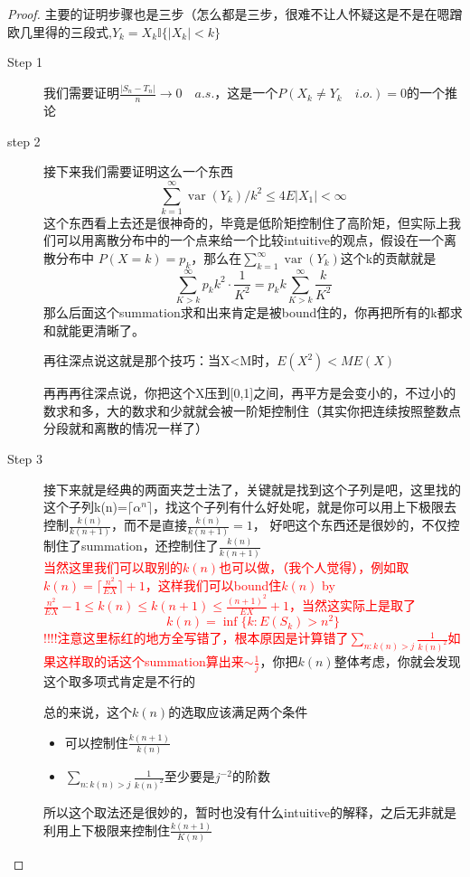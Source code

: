 \documentclass{article}
\newtheorem*{proof}{Proof}
\begin{document}
\begin{proof}
	主要的证明步骤也是三步（怎么都是三步，很难不让人怀疑这是不是在嗯蹭欧几里得的三段式,$Y_k=X_k\mathbb{I}\{|X_k|<k\}$
	\begin{description}
		\item[Step 1] 我们需要证明$\frac{|S_n-T_n|}{n}\to 0 \quad a.s.$，这是一个$P(X_k\ne Y_k \quad i.o.)=0$的一个推论
		\item[step 2] 接下来我们需要证明这么一个东西
		$$\sum_{k=1}^{\infty} \operatorname{var}\left(Y_k\right) / k^2 \leq 4 E\left|X_1\right|<\infty$$
		这个东西看上去还是很神奇的，毕竟是低阶矩控制住了高阶矩，但实际上我们可以用离散分布中的一个点来给一个比较intuitive的观点，假设在一个离散分布中 $ P(X=k)=p_k$，那么在$\sum_{k=1}^{\infty} \operatorname{var}\left(Y_k\right)$这个k的贡献就是
		$$\sum_{K>k}^{\infty} p_k k^2 \cdot \frac{1}{K^2}=p_k k\sum_{K>k}^{\infty}\frac{k}{K^2}$$
		那么后面这个summation求和出来肯定是被bound住的，你再把所有的k都求和就能更清晰了。
		\par 再往深点说这就是那个技巧：当X<M时，$E(X^2)<ME(X)$
		\par 再再再往深点说，你把这个X压到[0,1]之间，再平方是会变小的，不过小的数求和多，大的数求和少就就会被一阶矩控制住（其实你把连续按照整数点分段就和离散的情况一样了）
		\item[Step 3] 接下来就是经典的两面夹芝士法了，关键就是找到这个子列是吧，这里找的这个子列k(n)=$\lceil\alpha^n\rceil$，找这个子列有什么好处呢，就是你可以用上下极限去控制$\frac{k(n)}{k(n+1)}$，而不是直接$\frac{k(n)}{k(n+1)}=1$，
		好吧这个东西还是很妙的，不仅控制住了summation，还控制住了$\frac{k(n)}{k(n+1)}$
		\\
		\textcolor{red}{当然这里我们可以取别的$k(n)$也可以做，（我个人觉得），例如取$k(n)=\lceil\frac{n^2}{EX}\rceil+1$，这样我们可以bound住$k(n)$ by $\frac{n^2}{EX}-1\leq k(n)\leq k(n+1)\leq\frac{(n+1)^2}{EX}+1 $，当然这实际上是取了
		$$k(n)=\inf\{k:E(S_k)>n^2\}$$}
	\textcolor{red}{!!!!注意这里标红的地方全写错了，根本原因是计算错了$\sum_{n:k(n)>j}\frac{1}{k(n)^2}$如果这样取的话这个summation算出来$\sim \frac{1}{j}$}，你把$k(n)$整体考虑，你就会发现这个取多项式肯定是不行的
	\par 总的来说，这个$k(n)$的选取应该满足两个条件
	\begin{itemize}
		\item 可以控制住$\frac{k(n+1)}{k(n)}$
		\item $\sum_{n:k(n)>j}\frac{1}{k(n)^2}$至少要是$j^{-2}$的阶数
	\end{itemize}
	所以这个取法还是很妙的，暂时也没有什么intuitive的解释，之后无非就是利用上下极限来控制住$\frac{k(n+1)}{K(n)}$
	\end{description}
\end{proof}
\end{document}
